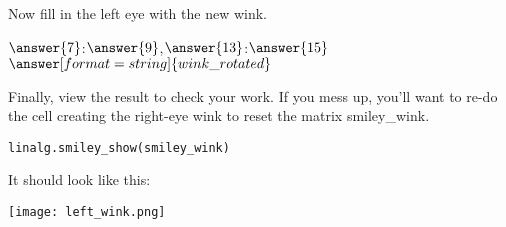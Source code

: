 \documentclass{ximera}
\begin{document}
\begin{problem}
\begin{enumerate}
Now fill in the left eye with the new wink.

$\answer{7}$:$\answer{9}$,$\answer{13}$:$\answer{15}$\mtlb{)=}$\answer[format=string]{wink\_rotated}$\mtlb{;}

Finally, view the result to check your work. If you mess up, you'll want to re-do the cell creating the right-eye wink to reset the matrix smiley\_wink.
\begin{verbatim}
linalg.smiley_show(smiley_wink)
\end{verbatim}

It should look like this:
\begin{center}
\texttt{[image: left\_wink.png]}
\end{center}

\end{enumerate}

\end{problem}
\end{document}
